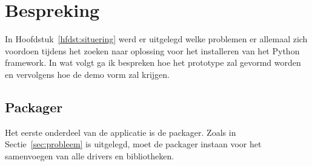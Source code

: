 \chapter{Bespreking}
In Hoofdstuk~\vref{hfdst:situering} werd er uitgelegd welke problemen er allemaal zich voordoen tijdens het zoeken naar oplossing voor het installeren van het Python framework. 
In wat volgt ga ik bespreken hoe het prototype zal gevormd worden en vervolgens hoe de demo vorm zal krijgen.
%

\section{Packager}
Het eerste onderdeel van de applicatie is de packager.
Zoals in Sectie~\ref{sec:probleem} is uitgelegd, moet de packager instaan voor het samenvoegen van alle drivers en bibliotheken.
%
%


